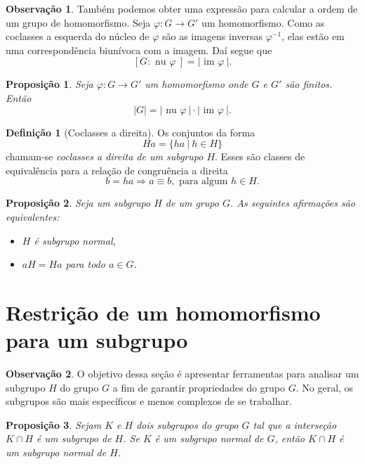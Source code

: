 \documentclass[a4paper,12pt]{report}
\theoremstyle{plain}
\newtheorem{proposicao}{Proposição}[section]
\theoremstyle{definition}
\newtheorem{definicao}{Definição}[section]
\newtheorem{observacao}{Observação}[section]
\begin{document}
\begin{observacao}
	Também podemos obter uma expressão para calcular a ordem de um grupo de
	homomorfismo. Seja \(\varphi: G\longrightarrow G'\) um homomorfismo.
	Como as coclasses a esquerda do núcleo de \(\varphi\) são as imagens
	inversas \(\varphi^{-1}\), elas estão em uma correspondência biunívoca
	com a imagem. Daí segue que
	\[[G:\text{ nu }\varphi\ ] = |\text{ im }\varphi\ |.\]
\end{observacao}

\begin{proposicao}
	Seja \(\varphi: G\longrightarrow G'\) um
	homomorfismo onde \(G\) e \(G'\) são finitos. Então
	\[|G| = |\text{ nu }\varphi\ |\cdot|\text{ im }\varphi\ |.\]	
\end{proposicao}

\begin{definicao}[Coclasses a direita]
	Os conjuntos da forma
	\[Ha = \{ha \ | \ h \in H\}\] chamam-se \emph{coclasses a direita de um
		subgrupo \(H\)}. Esses são classes de equivalência para a relação de
	congruência a direita
	\[b = ha \Rightarrow a \equiv b, \text{ para algum }h \in H.\]	
\end{definicao}

\begin{proposicao}
	Seja um subgrupo \(H\) de um grupo \(G\). As
	seguintes afirmações são equivalentes:
	
	\begin{itemize}
		\item
		\(H\) é subgrupo normal,
		\item
		\(aH = Ha\) para todo \(a\in G\).
	\end{itemize}	
\end{proposicao}

\section{Restrição de um homomorfismo para um subgrupo}

\begin{observacao}
	O objetivo dessa seção é apresentar ferramentas para analisar um subgrupo \(H\)
	do grupo \(G\) a fim de garantir propriedades do grupo \(G\). No geral,
	os subgrupos são mais específicos e menos complexos de se trabalhar.
\end{observacao}

\begin{proposicao}
	Sejam \(K\) e \(H\) dois subgrupos do grupo \(G\)
	tal que a interseção \(K\cap H\) é um subgrupo de \(H\). Se \(K\) é um
	subgrupo normal de \(G\), então \(K\cap H\) é um subgrupo normal de
	\(H\).	
\end{proposicao}
\end{document}
